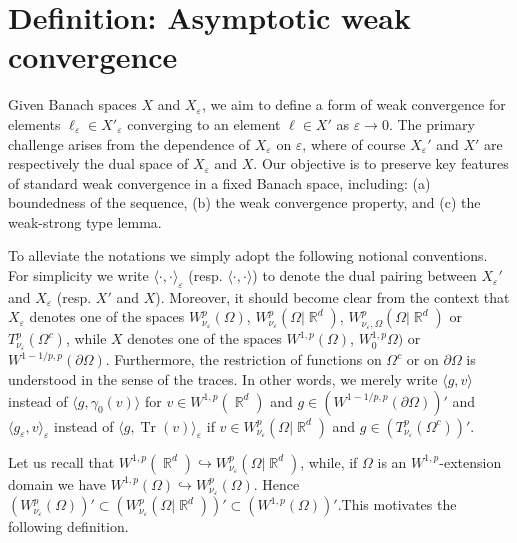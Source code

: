 \documentclass[12pt, reqno]{amsart}%
\theoremstyle{plain}  %
\theoremstyle{definition}  %
\numberwithin{equation}{section}
\DeclareMathOperator{\R}{\mathbb{R}}
\newcommand{\eps}{\varepsilon}
\newcommand{\WnuOmRa}{W^p_{\nu_\eps}(\Omega|\R^d )}
\newcommand{\TnuOma}{T^p_{\nu_\eps} (\Omega^c)}
\begin{document}
\section{Definition: Asymptotic weak convergence}  \label{sec:asymp-conv-weak}
Given Banach spaces $X$ and $X_\eps$, we aim to define a form of weak convergence for elements
$ \ell_\eps \in X'_\eps $ converging to an element $\ell \in X' $ as  $\varepsilon \to 0$. The primary challenge arises from the dependence of $X_\eps $ on $ \varepsilon$, where of course $X_\eps'$  and $X'$ are respectively the dual space of $X_\eps$ and $X$. Our objective is to preserve key features of standard weak convergence in a fixed Banach space, including: (a) boundedness of the sequence, (b) the weak convergence property, and (c) the weak-strong type lemma.


To alleviate the notations we simply adopt the following notional conventions.  For simplicity we write $\langle\cdot,\cdot \rangle_\eps$ (resp. $\langle\cdot,\cdot \rangle$) to denote the dual pairing between $X_\eps'$ and $X_\eps$ (resp. $X'$ and $X$).  Moreover, it should become clear  from the context that $X_\eps$ denotes one of the spaces $W^p_{\nu_\eps}(\Omega)$, $W^p_{\nu_\eps}(\Omega|\R^d)$, $W^p_{\nu_\eps, \Omega}(\Omega|\R^d)$  or  $T^p_{\nu_\eps}(\Omega^c)$, while  $X$ denotes one of the spaces $W^{1,p}(\Omega)$, $W^{1,p}_0\Omega)$ or $W^{1-1/p ,p}(\partial\Omega)$. Furthermore, the restriction of functions on $\Omega^c$ or on $\partial\Omega$  is understood in the sense of the traces. In other words, we merely write $\langle g,v\rangle$ instead of $\langle g,\gamma_0(v )\rangle$ for  $v\in W^{1,p}(\R^d)$ and $g\in (W^{1-1/p ,p}(\partial\Omega))'$  and $\langle g_\eps,v\rangle_\eps $ instead of $\langle g,\operatorname{Tr}(v )\rangle_\eps$   if $v\in \WnuOmRa $ and $g\in (\TnuOma)'$.

\vspace{2mm}
\par Let us recall that $W^{1,p}(\R^d)\hookrightarrow W^p_{\nu_\eps}(\Omega|\R^d)$, while, if $\Omega$ is an $W^{1,p}$-extension domain we have $W^{1,p}(\Omega)\hookrightarrow W^p_{\nu_\eps}(\Omega)$. Hence  $(W^p_{\nu_\eps}(\Omega))'\subset (W^p_{\nu_\eps}(\Omega|\R^d))'\subset (W^{1,p}(\Omega))'$.This motivates the following definition.
\end{document}
